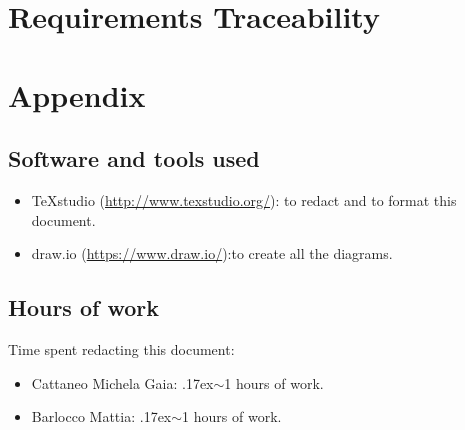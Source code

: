 \documentclass[18pt,oneside,a4paper, titlepage]{article}
\begin{document}
	\section{Requirements Traceability}

	\section{Appendix}
		\subsection{Software and tools used}
				\begin{itemize}
					\item TeXstudio (\url{http://www.texstudio.org/}): to redact and to format this document.
					\item draw.io (\url{https://www.draw.io/}):to create all the diagrams.
				\end{itemize}
		\subsection{Hours of work}
			Time spent redacting this document:
			\begin{itemize}
				\item Cattaneo Michela Gaia: {\raise.17ex\hbox{$\scriptstyle\sim$}}1 hours of work.
				\item Barlocco Mattia: {\raise.17ex\hbox{$\scriptstyle\sim$}}1 hours of work.
			\end{itemize}
		
		
		
\end{document}
